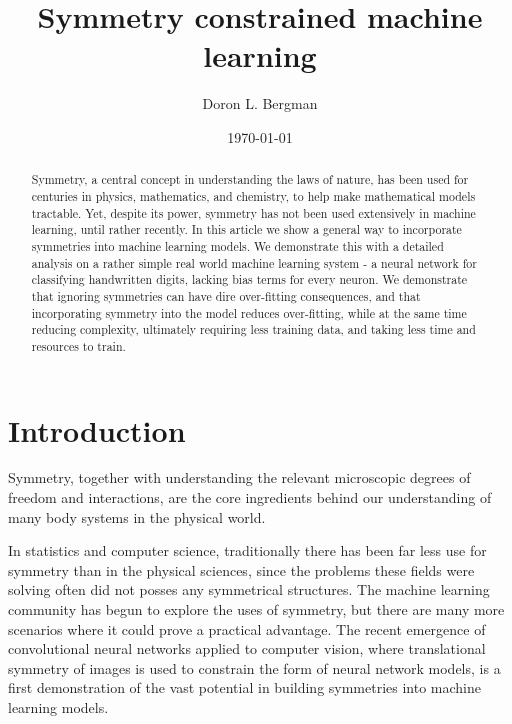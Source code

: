 \documentclass[twocolumn, prl, nofootinbib]{revtex4-1}
\begin{document}
\newcommand{\be}{\begin{equation}}
\newcommand{\ee}{\end{equation}}


\title{Symmetry constrained machine learning}
\date{\today}

\author{Doron L. Bergman}

\begin{abstract}
Symmetry, a central concept in understanding the laws of nature, has been used for centuries in physics, mathematics, and chemistry, to help make mathematical models tractable. Yet, despite its power, symmetry has not been used extensively in machine learning, until rather recently. In this article we show a general way to incorporate symmetries into machine learning models. We demonstrate this with a detailed analysis on a rather simple real world machine learning system - a neural network for classifying handwritten digits, lacking bias terms for every neuron. We demonstrate that ignoring symmetries can have dire over-fitting consequences, and that incorporating symmetry into the model reduces over-fitting, while at the same time reducing complexity, ultimately requiring less training data, and taking less time and resources to train.
\end{abstract}

\maketitle


\section{Introduction}
\label{Sec:Intro}


Symmetry, together with understanding the relevant microscopic degrees of freedom and interactions, are the core ingredients behind our understanding of many body systems in the physical world.


In statistics and computer science, traditionally there has been far less use for symmetry than in the physical sciences,
since the problems these fields were solving often did not posses any symmetrical structures. The machine learning community has begun to explore the uses of symmetry, but there are many more scenarios where it could prove a practical advantage. The recent emergence of convolutional neural networks applied to computer vision\cite{lecun1989generalization, lecun1999object, lecun1990handwritten, lecun1998gradient, krizhevsky2012imagenet, lee2009convolutional, lecun2015deep}, where translational symmetry of images is used to constrain the form of neural network models, is a first demonstration of the vast potential in building symmetries into machine learning models.
\end{document}
